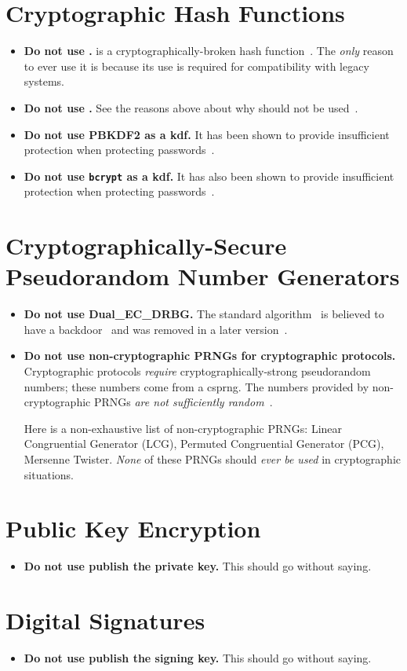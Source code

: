 \section{Cryptographic Hash Functions}

\begin{itemize}
\item \textbf{Do not use \MDFive{}.}
    \MDFive{} is a cryptographically-broken \gls{hash function}~\cite{rfc6151}.
    The \emph{only} reason to ever use it is because its use is required
        for compatibility with legacy systems.
\item \textbf{Do not use \ShaOne{}.}
    See the reasons above about why \MDFive{} should not be used~\cite{rfc6194}.
\item \textbf{Do not use PBKDF2 as a \gls{kdf}.}
    It has been shown to provide insufficient protection
    when protecting passwords~\cite{blocki2018economics}.
\item \textbf{Do not use \texttt{bcrypt} as a \gls{kdf}.}
    It has also been shown to provide insufficient protection
    when protecting passwords~\cite{blocki2018economics}.
\end{itemize}

\section{Cryptographically-Secure Pseudorandom Number Generators}

\begin{itemize}
\item \textbf{Do not use Dual\_EC\_DRBG.}
    The standard algorithm~\cite[Section~10.3.1]{NIST-SP-800-90A}
    is believed to have a backdoor~\cite{BernsteinDualEC}
    and was removed in a later version~\cite{NIST-SP-800-90ARev1}.
\item \textbf{Do not use non-cryptographic PRNGs for cryptographic protocols.}
    Cryptographic protocols \emph{require} cryptographically-strong
    pseudorandom numbers;
    these numbers come from a \gls{csprng}.
    The numbers provided by non-cryptographic PRNGs
    \emph{are not sufficiently random}~\cite{marsaglia1968random,bouillaguet2020practical}.

    Here is a non-exhaustive list of non-cryptographic PRNGs:
    Linear Congruential Generator (LCG), Permuted Congruential Generator (PCG),
    Mersenne Twister.
    \emph{None} of these PRNGs should \emph{ever be used}
    in cryptographic situations.
\end{itemize}

\section{Public Key Encryption}

\begin{itemize}
\item \textbf{Do not use publish the private key.}
    This should go without saying.
\end{itemize}

\section{Digital Signatures}

\begin{itemize}
\item \textbf{Do not use publish the signing key.}
    This should go without saying.
\end{itemize}

